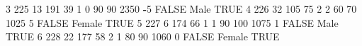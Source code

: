 \documentclass[
]{article}
\newenvironment{Shaded}{\begin{snugshade}}{\end{snugshade}}
\newcommand{\ConstantTok}[1]{\textcolor[rgb]{0.56,0.35,0.01}{#1}}
\newcommand{\DecValTok}[1]{\textcolor[rgb]{0.00,0.00,0.81}{#1}}
\newcommand{\NormalTok}[1]{#1}
\newcommand{\SpecialCharTok}[1]{\textcolor[rgb]{0.81,0.36,0.00}{\textbf{#1}}}
\begin{document}
\begin{Shaded}
\begin{Highlighting}[]
\DecValTok{3} \DecValTok{225}        \DecValTok{13}   \DecValTok{191}    \DecValTok{39}     \DecValTok{1}       \DecValTok{0}       \DecValTok{90}        \DecValTok{90}     \DecValTok{2350}      \SpecialCharTok{{-}}\DecValTok{5} \ConstantTok{FALSE}\NormalTok{ Male   }\ConstantTok{TRUE}           
\DecValTok{4} \DecValTok{226}        \DecValTok{32}   \DecValTok{105}    \DecValTok{75}     \DecValTok{2}       \DecValTok{2}       \DecValTok{60}        \DecValTok{70}     \DecValTok{1025}       \DecValTok{5} \ConstantTok{FALSE}\NormalTok{ Female }\ConstantTok{TRUE}           
\DecValTok{5} \DecValTok{227}         \DecValTok{6}   \DecValTok{174}    \DecValTok{66}     \DecValTok{1}       \DecValTok{1}       \DecValTok{90}       \DecValTok{100}     \DecValTok{1075}       \DecValTok{1} \ConstantTok{FALSE}\NormalTok{ Male   }\ConstantTok{TRUE}           
\DecValTok{6} \DecValTok{228}        \DecValTok{22}   \DecValTok{177}    \DecValTok{58}     \DecValTok{2}       \DecValTok{1}       \DecValTok{80}        \DecValTok{90}     \DecValTok{1060}       \DecValTok{0} \ConstantTok{FALSE}\NormalTok{ Female }\ConstantTok{TRUE}           
\end{Highlighting}
\end{Shaded}
\end{document}
